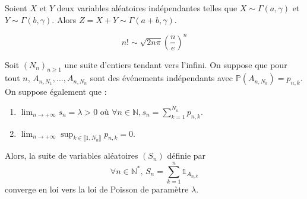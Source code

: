 
  \begin{lemma}
    Soient $X$ et $Y$ deux variables aléatoires indépendantes telles que $X \sim \Gamma(a, \gamma)$ et $Y \sim \Gamma(b, \gamma)$. Alors $Z = X + Y \sim \Gamma(a+b, \gamma)$.
  \end{lemma}


  \begin{application}
    \[ n! \sim \sqrt{2n\pi} \left(\frac{n}{e} \right)^n \]
  \end{application}


  \begin{application}
    Soit $(N_n)_{n \geq 1}$ une suite d'entiers tendant vers l'infini. On suppose que pour tout $n$, $A_{n,N_1}, \dots , A_{n,N_n}$ sont des événements indépendants avec $\mathbb{P}(A_{n,N_k}) = p_{n,k}$. On suppose également que :
    \begin{enumerate}[label=(\roman*)]
      \item $\lim_{n \rightarrow +\infty} s_n = \lambda > 0$ où $\forall n \in \mathbb{N}, s_n = \sum_{k=1}^{N_n} p_{n,k}$.
      \item $\lim_{n \rightarrow +\infty} \sup_{k \in \llbracket 1, N_n \rrbracket} p_{n,k} = 0$.
    \end{enumerate}
    Alors, la suite de variables aléatoires $(S_n)$ définie par
    \[ \forall n \in \mathbb{N}^*, \, S_n = \sum_{k=1}^n \mathbb{1}_{A_{n,k}} \]
    converge en loi vers la loi de Poisson de paramètre $\lambda$.
  \end{application}

